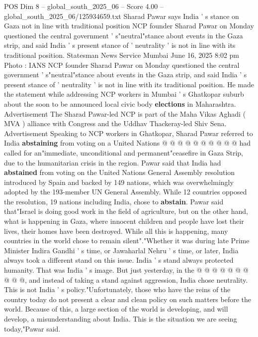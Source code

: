 \begin{textsample}{POS Dim 8 – global\_south\_2025\_06 – Score 4.00 – global\_south\_2025\_06/125934659.txt}  \label{ex:f8_pos_421}
Sharad Pawar says India ' s stance on Gaza not in line with traditional position NCP founder Sharad Pawar on Monday questioned the central government ' s"neutral"stance about events in the Gaza strip, and said India ' s present stance of ' neutrality ' is not in line with its traditional position.
Statesman News Service Mumbai June 16, 2025 8:02 pm Photo : IANS NCP founder Sharad Pawar on Monday questioned the central government ' s"neutral"stance about events in the Gaza strip, and said India ' s present stance of ' neutrality ' is not in line with its traditional position.
He made the statement while addressing NCP workers in Mumbai ' s Ghatkopar suburb about the soon to be announced local civic body \textbf{elections} in Maharashtra.
Advertisement The Sharad Pawar-led NCP is part of the Maha Vikas Aghadi ( MVA ) alliance with Congress and the Uddhav Thackeray-led Shiv Sena.
Advertisement Speaking to NCP workers in Ghatkopar, Sharad Pawar referred to India \textbf{abstaining} from voting on a United Nations @ @ @ @ @ @ @ @ @ @ had called for an"immediate, unconditional and permanent"ceasefire in Gaza Strip, due to the humanitarian crisis in the region.
Pawar said that India had \textbf{abstained} from voting on the United Nations General Assembly resolution introduced by Spain and backed by 149 nations, which was overwhelmingly adopted by the 193-member UN General Assembly.
While 12 countries opposed the resolution, 19 nations including India, chose to \textbf{abstain}.
Pawar said that"Israel is doing good work in the field of agriculture, but on the other hand, what is happening in Gaza, where innocent children and people have lost their lives, their homes have been destroyed.
While all this is happening, many countries in the world chose to remain silent"."Whether it was during late Prime Minister Indira Gandhi ' s time, or Jawaharlal Nehru ' s time, or later, India always took a different stand on this issue.
India ' s stand always protected humanity.
That was India ' s image.
But just yesterday, in the @ @ @ @ @ @ @ @ @ @, and instead of taking a stand against aggression, India chose neutrality.
This is not India ' s policy."Unfortunately, those who have the reins of the country today do not present a clear and clean policy on such matters before the world.
Because of this, a large section of the world is developing, and will develop, a misunderstanding about India.
This is the situation we are seeing today,"Pawar said.

\end{textsample}
